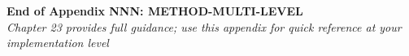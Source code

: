 \nocite{bcm_master}


\vspace{2cm}
\begin{center}
{\large \textbf{End of Appendix NNN: METHOD-MULTI-LEVEL}} \\
\vspace{0.5cm}
{\small \textit{Chapter 23 provides full guidance; use this appendix for quick reference at your implementation level}}
\end{center}
